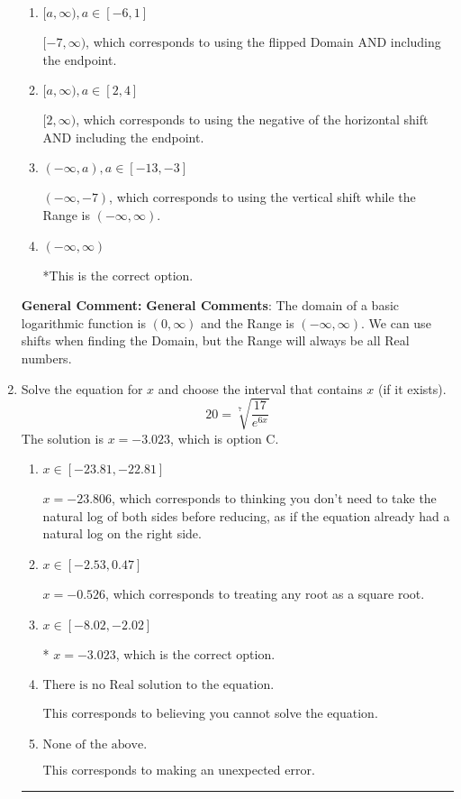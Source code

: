 \documentclass{extbook}[14pt]
\newcommand{\litem}[1]{\item #1

\rule{\textwidth}{0.4pt}}
\begin{document}
\begin{enumerate}
{\begin{enumerate}[label=\Alph*.]
$(-\infty, 7)$, which corresponds to using the using the negative of vertical shift on $(0, \infty)$.
\item \( [a, \infty), a \in [-6, 1] \)

$[-7, \infty)$, which corresponds to using the flipped Domain AND including the endpoint.
\item \( [a, \infty), a \in [2, 4] \)

$[2, \infty)$, which corresponds to using the negative of the horizontal shift AND including the endpoint.
\item \( (-\infty, a), a \in [-13, -3] \)

$(-\infty, -7)$, which corresponds to using the vertical shift while the Range is $(-\infty, \infty)$.
\item \( (-\infty, \infty) \)

*This is the correct option.
\end{enumerate}

\textbf{General Comment:} \textbf{General Comments}: The domain of a basic logarithmic function is $(0, \infty)$ and the Range is $(-\infty, \infty)$. We can use shifts when finding the Domain, but the Range will always be all Real numbers.
}
\litem{
 Solve the equation for $x$ and choose the interval that contains $x$ (if it exists).
\[  20 = \sqrt[7]{\frac{17}{e^{6x}}} \]The solution is \( x = -3.023 \), which is option C.\begin{enumerate}[label=\Alph*.]
\item \( x \in [-23.81, -22.81] \)

$x = -23.806$, which corresponds to thinking you don't need to take the natural log of both sides before reducing, as if the equation already had a natural log on the right side.
\item \( x \in [-2.53, 0.47] \)

$x = -0.526$, which corresponds to treating any root as a square root.
\item \( x \in [-8.02, -2.02] \)

* $x = -3.023$, which is the correct option.
\item \( \text{There is no Real solution to the equation.} \)

This corresponds to believing you cannot solve the equation.
\item \( \text{None of the above.} \)

This corresponds to making an unexpected error.
\end{enumerate}

}
\end{enumerate}
\end{document}
